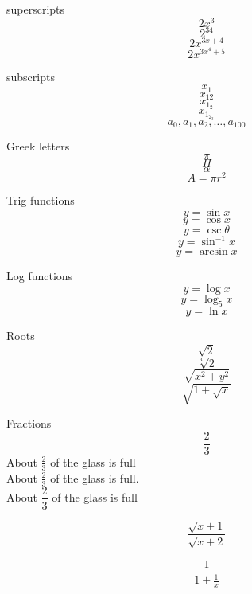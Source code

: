 \documentclass[11pt]{article}
\begin{document}
superscripts $$2x^3$$
$$2^{34}$$
$$2x^{3x+4}$$
$$2x^{3x^4+5}$$

subscripts
$$x_1$$
$$x_{12}$$
$$x_{1_2}$$
$$x_{1_{2_3}}$$
$$a_0, a_1, a_2, \ldots, a_{100}$$

Greek letters
$$\pi$$
$$\Pi$$
$$\alpha$$
$$A=\pi r^2$$

Trig functions
$$y=\sin x$$
$$y=\cos x$$
$$y=\csc \theta$$
$$y=\sin^{-1} x$$
$$y=\arcsin x$$

Log functions
$$y=\log x$$
$$y=\log_5 x$$
$$y=\ln x$$

Roots
$$\sqrt{2}$$
$$\sqrt[3]{2}$$
$$\sqrt{x^2+y^2}$$
$$\sqrt{ 1 + \sqrt{x} }$$

Fractions
$$\frac{2}{3}$$
About $\frac{2}{3}$ of the glass is full \\[16 pt]
About $\displaystyle \frac{2}{3}$ of the glass is full.\\[6 pt]
About $\dfrac{2}{3}$ of the glass is full

$$\frac{\sqrt{x+1}}{\sqrt{x+2}}$$

$$\frac{1}{  1+\frac{1}{x}  }$$
\end{document}
